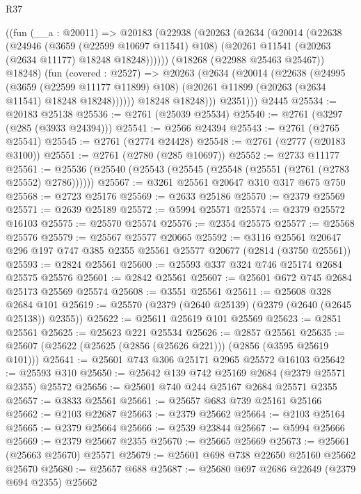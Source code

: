 \begin{lexlean}{R37}
\begin{coremodule}
        ((fun (__a : @20011) =>
        @20183
          (@22938
            (@20263
              (@2634
                (@20014
                  (@22638
                    (@24946
                      (@3659 (@22599 @10697 @11541) @108)
                      (@20261 @11541 (@20263 (@2634 @11177) @18248 @18248))))))
              (@18268 (@22988 @25463 @25467))
              @18248)
            (fun (covered : @2527) =>
            @20263
              (@2634
                (@20014
                  (@22638
                    (@24995
                      (@3659 (@22599 @11177 @11899) @108)
                      (@20261 @11899 (@20263 (@2634 @11541) @18248 @18248))))))
              @18248
              @18248)))
          @2351)))
    @2445
@25534 := @20183 @25138
@25536 := @2761 (@25039 @25534)
@25540 := @2761 (@3297 (@285 (@3933 @24394)))
@25541 := @2566 @24394
@25543 := @2761 (@2765 @25541)
@25545 := @2761 (@2774 @24428)
@25548 := @2761 (@2777 (@20183 @3100))
@25551 := @2761 (@2780 (@285 @10697))
@25552 := @2733 @11177
@25561 := @25536 (@25540 (@25543 (@25545 (@25548 (@25551 (@2761 (@2783 @25552) @2786))))))
@25567 := @3261 @25561 @20647 @310 @317 @675 @750
@25568 := @2723 @25176
@25569 := @2633 @25186
@25570 := @2379 @25569
@25571 := @2639 @25189
@25572 := @5994 @25571
@25574 := @2379 @25572 @16103
@25575 := @25570 @25574
@25576 := @2354 @25575
@25577 := @25568 @25576
@25579 := @25567 @25577 @20665
@25592 := @3116 @25561 @20647 @296 @197 @747 @385 @2355 @25561 @25577 @20677 (@2814 (@3750 @25561))
@25593 := @2824 @25561
@25600 := @25593 @337 @324 @746 @25174 @2684 @25575 @25576
@25601 := @2842 @25561
@25607 := @25601 @672 @745 @2684 @25173 @25569 @25574
@25608 := @3551 @25561
@25611 := @25608 @328 @2684 @101
@25619 := @25570 (@2379 (@2640 @25139) (@2379 (@2640 (@2645 @25138)) @2355))
@25622 := @25611 @25619 @101 @25569
@25623 := @2851 @25561
@25625 := @25623 @221 @25534
@25626 := @2857 @25561
@25635 := @25607 (@25622 (@25625 (@2856 (@25626 @221))) (@2856 (@3595 @25619 @101)))
@25641 := @25601 @743 @306 @25171 @2965 @25572 @16103
@25642 := @25593 @310
@25650 := @25642 @139 @742 @25169 @2684 (@2379 @25571 @2355) @25572
@25656 := @25601 @740 @244 @25167 @2684 @25571 @2355
@25657 := @3833 @25561
@25661 := @25657 @683 @739 @25161 @25166
@25662 := @2103 @22687
@25663 := @2379 @25662
@25664 := @2103 @25164
@25665 := @2379 @25664
@25666 := @2539 @23844
@25667 := @5994 @25666
@25669 := @2379 @25667 @2355
@25670 := @25665 @25669
@25673 := @25661 (@25663 @25670) @25571
@25679 := @25601 @698 @738 @22650 @25160 @25662 @25670
@25680 := @25657 @688
@25687 := @25680 @697 @2686 @22649 (@2379 @694 @2355) @25662

\end{coremodule}
\end{lexlean}
